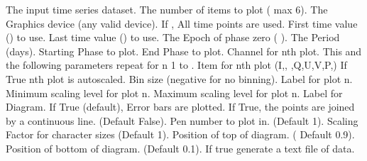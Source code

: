 \begin{manroutinedescription}
\begin{manparametertable}
  The input %
time series dataset.
  The number of items to plot (%
max 6).
   The Graphics device (any %
valid {} device).
  If {}, All time %
points are used.
   First time value ({}) to use.
   Last time value ({}) %
to use.
   The Epoch of phase zero ({%
}).
   The Period (days).
   Starting Phase to plot.
   End Phase to plot.
  Channel for nth plot. This and the
                               following parameters repeat for
                               n {\mantt{=}} 1 to {}.
     Item for nth plot (I,{},{%
},Q,U,V,P,{})
  If True nth plot is autoscaled.
   Bin size (negative for no binning).
     Label for plot n.
     Minimum scaling level for plot n.
     Maximum scaling level for plot n.
     Label for Diagram.
  If True (default), Error %
bars are plotted.
  If True, the points are joined %
by a
                               continuous line. (Default False).
  {} Pen number to %
plot in. (Default 1).
     Scaling Factor for character %
sizes (Default 1).
     Position of top of diagram. (%
Default 0.9).
     Position of bottom of %
diagram. (Default 0.1).
  If true generate a text file %
of data.

\end{manparametertable}
\end{manroutinedescription}
